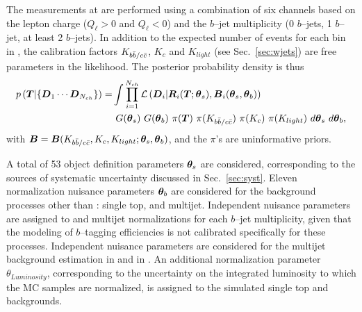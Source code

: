 The measurements at \eighttev{}  are
performed using a combination of six channels based on
the lepton charge ($Q_\ell>0$ and $Q_\ell<0$) and the $b$--jet multiplicity
(0 $b$--jets, 1 $b$--jet, at least 2 $b$--jets). In addition to the
expected number of \ttbar{} events for each bin in \Truth{}, the
\wjets{} calibration factors $K_{b\bar{b}{}/c\bar{c}{}}$, $K_c$ and
$K_{light}$ (see Sec.~\ref{sec:wjets}) are free parameters in the likelihood.
The posterior probability density is thus
\begin{equation}
\begin{split}
  p\left(\boldsymbol{T}{}|\{\boldsymbol{D}{}_1\cdots{}\boldsymbol{D}{}_{N_{ch}}\}\right)=&
  \int
  \prod_{i=1}^{N_{ch}}\mathcal{L}\left(\boldsymbol{D}{}_i|\boldsymbol{R}{}_i(\boldsymbol{T}{};\boldsymbol{\theta}{}_s),\boldsymbol{B}{}_i(\boldsymbol{\theta}{}_s,\boldsymbol{\theta}{}_b)\right)\\
&  ~G(\boldsymbol{\theta}{}_s)
  ~G(\boldsymbol{\theta}{}_b)
  ~\pi{}(\boldsymbol{T}{})
  ~\pi{}(K_{b\bar{b}{}/c\bar{c}{}})
  ~\pi{}(K_c)
  ~\pi{}(K_{light})
  ~d\boldsymbol{\theta}{}_s
  ~d\boldsymbol{\theta}{}_b,\\
\end{split}
\end{equation}
with
$\boldsymbol{B}{}=\boldsymbol{B}{}(K_{b\bar{b}{}/c\bar{c}{}},K_c,K_{light};\boldsymbol{\theta}_s,\boldsymbol{\theta}{}_b)$,
and the $\pi{}$'s are uninformative priors.

A total of 53 object definition parameters $\boldsymbol{\theta}_s$ are 
considered, corresponding to the sources of systematic uncertainty
discussed in Sec.~\ref{sec:syst}.
Eleven normalization nuisance parameters $\boldsymbol{\theta}_b$ are considered
for the background processes other than \wjets{}: single top, \zjets{} and
multijet. Independent nuisance parameters are assigned to \zjets{}
and multijet normalizations for each $b$--jet multiplicity, given that
the modeling of $b$--tagging efficiencies is not calibrated
specifically for these processes. Independent nuisance parameters are
considered for the multijet background estimation in \mujets{} and in
\ejets{}. An additional normalization parameter $\theta_{Luminosity}$,
corresponding to the uncertainty on the integrated luminosity to which
the MC samples are normalized, is assigned to the simulated single
top and \zjets{} backgrounds.

